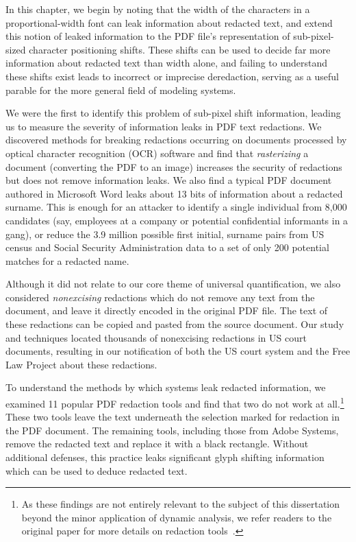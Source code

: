 In this chapter, we begin by noting that the width of the characters in a proportional-width font can leak information about redacted text, and extend this notion of leaked information to the PDF file's representation of sub-pixel-sized character positioning shifts.
These shifts can be used to decide far more information about redacted text than width alone, and failing to understand these shifts exist leads to incorrect or imprecise deredaction, serving as a useful parable for the more general field of modeling systems.

We were the first to identify this problem of sub-pixel shift information, leading us to measure the severity of information leaks in PDF text redactions.
We discovered methods for breaking redactions occurring on documents processed by optical character recognition (OCR) software and find that \emph{rasterizing} a document (converting the PDF to an image) increases the security of redactions but does not remove information leaks.
We also find a typical PDF document authored in Microsoft Word leaks about 13 bits of information about a redacted surname. 
This is enough for an attacker to identify a single individual from 8,000 candidates (say, employees at a company or potential confidential informants in a gang), or reduce the 3.9 million possible first initial, surname pairs from US census and Social Security Administration data to a set of only 200 potential matches for a redacted name.

Although it did not relate to our core theme of universal quantification, we also considered \emph{nonexcising} redactions which do not remove any text from the document, and leave it directly encoded in the original PDF file.
The text of these redactions can be copied and pasted from the source document.
Our study and techniques located thousands of nonexcising redactions in US court documents, resulting in our notification of both the US court system and the Free Law Project about these redactions.

To understand the methods by which systems leak redacted information, we examined 11 popular PDF redaction tools and find that two do not work at all.\footnote{As these findings are not entirely relevant to the subject of this dissertation beyond the minor application of dynamic analysis, we refer readers to the original paper for more details on redaction tools~\cite{bland2023story}.}
These two tools leave the text underneath the selection marked for redaction in the PDF document.
The remaining tools, including those from Adobe Systems, remove the redacted text and replace it with a black rectangle.
Without additional defenses, this practice leaks significant glyph shifting information which can be used to deduce redacted text.


